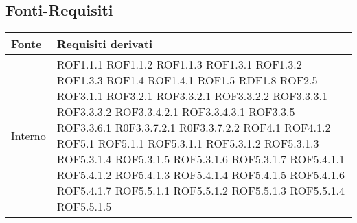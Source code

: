 \subsection{Fonti-Requisiti} %
\label{ssub:fonti_requisiti}
\begin{center}
\def\arraystretch{1.5}
\bgroup
\begin{longtable}{| p{4cm} | p{4cm} |}
\hline
\textbf{Fonte} & \textbf{Requisiti derivati} \\
\hline
Interno & ROF1.1.1 \newline ROF1.1.2 \newline ROF1.1.3 \newline ROF1.3.1 \newline ROF1.3.2 \newline ROF1.3.3 \newline ROF1.4 \newline ROF1.4.1 \newline ROF1.5 \newline RDF1.8 \newline ROF2.5 \newline ROF3.1.1 \newline ROF3.2.1 \newline ROF3.3.2.1 \newline ROF3.3.2.2 \newline ROF3.3.3.1 \newline ROF3.3.3.2 \newline ROF3.3.4.2.1 \newline ROF3.3.4.3.1 \newline ROF3.3.5 \newline ROF3.3.6.1 \newline R0F3.3.7.2.1 \newline R0F3.3.7.2.2 \newline ROF4.1 \newline ROF4.1.2 \newline ROF5.1 \newline ROF5.1.1 \newline ROF5.3.1.1 \newline ROF5.3.1.2 \newline ROF5.3.1.3 \newline ROF5.3.1.4 \newline ROF5.3.1.5 \newline ROF5.3.1.6 \newline ROF5.3.1.7 \newline ROF5.4.1.1 \newline ROF5.4.1.2 \newline ROF5.4.1.3 \newline ROF5.4.1.4 \newline ROF5.4.1.5 \newline ROF5.4.1.6 \newline ROF5.4.1.7 \newline ROF5.5.1.1 \newline ROF5.5.1.2 \newline ROF5.5.1.3 \newline ROF5.5.1.4 \newline ROF5.5.1.5 \\

\end{longtable}
\end{center}
